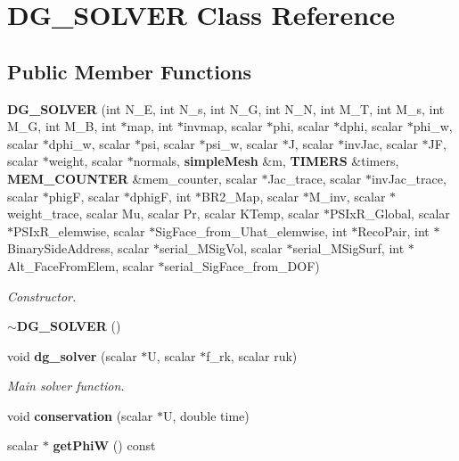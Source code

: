 \section{D\-G\-\_\-\-S\-O\-L\-V\-E\-R Class Reference}
\label{classDG__SOLVER}
\subsection*{Public Member Functions}
\begin{DoxyCompactItemize}
\item 
{\bf D\-G\-\_\-\-S\-O\-L\-V\-E\-R} (int N\-\_\-\-E, int N\-\_\-s, int N\-\_\-\-G, int N\-\_\-\-N, int M\-\_\-\-T, int M\-\_\-s, int M\-\_\-\-G, int M\-\_\-\-B, int $\ast$map, int $\ast$invmap, scalar $\ast$phi, scalar $\ast$dphi, scalar $\ast$phi\-\_\-w, scalar $\ast$dphi\-\_\-w, scalar $\ast$psi, scalar $\ast$psi\-\_\-w, scalar $\ast$J, scalar $\ast$inv\-Jac, scalar $\ast$J\-F, scalar $\ast$weight, scalar $\ast$normals, {\bf simple\-Mesh} \&m, {\bf T\-I\-M\-E\-R\-S} \&timers, {\bf M\-E\-M\-\_\-\-C\-O\-U\-N\-T\-E\-R} \&mem\-\_\-counter, scalar $\ast$Jac\-\_\-trace, scalar $\ast$inv\-Jac\-\_\-trace, scalar $\ast$phig\-F, scalar $\ast$dphig\-F, int $\ast$B\-R2\-\_\-\-Map, scalar $\ast$M\-\_\-inv, scalar $\ast$weight\-\_\-trace, scalar Mu, scalar Pr, scalar K\-Temp, scalar $\ast$P\-S\-Ix\-R\-\_\-\-Global, scalar $\ast$P\-S\-Ix\-R\-\_\-elemwise, scalar $\ast$Sig\-Face\-\_\-from\-\_\-\-Uhat\-\_\-elemwise, int $\ast$Reco\-Pair, int $\ast$Binary\-Side\-Address, scalar $\ast$serial\-\_\-\-M\-Sig\-Vol, scalar $\ast$serial\-\_\-\-M\-Sig\-Surf, int $\ast$Alt\-\_\-\-Face\-From\-Elem, scalar $\ast$serial\-\_\-\-Sig\-Face\-\_\-from\-\_\-\-D\-O\-F)
\begin{DoxyCompactList}\small\item\em Constructor. \end{DoxyCompactList}\item 
{\bf $\sim$\-D\-G\-\_\-\-S\-O\-L\-V\-E\-R} ()
\item 
void {\bf dg\-\_\-solver} (scalar $\ast$U, scalar $\ast$f\-\_\-rk, scalar ruk)
\begin{DoxyCompactList}\small\item\em Main solver function. \end{DoxyCompactList}\item 
void {\bf conservation} (scalar $\ast$U, double time)
\item 
scalar $\ast$ {\bf get\-Phi\-W} () const 
\end{DoxyCompactItemize}


